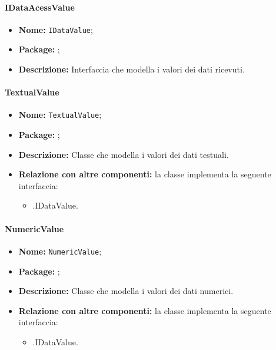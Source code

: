 \paragraph{IDataAcessValue}
\begin{itemize}
\item \textbf{Nome:} \texttt{IDataValue};
\item \textbf{Package:} \texttt{\smodel{}};
\item \textbf{Descrizione:} Interfaccia che modella i valori dei dati ricevuti.
\end{itemize}

\paragraph{TextualValue}
\begin{itemize}
\item \textbf{Nome:} \texttt{TextualValue};
\item \textbf{Package:} \texttt{\smodel{}};
\item \textbf{Descrizione:} Classe che modella i valori dei dati testuali.
\item \textbf{Relazione con altre componenti:} la classe implementa la seguente interfaccia:
		\begin{itemize}
			\item \smodel{}.IDataValue.
		\end{itemize}
\end{itemize}

\paragraph{NumericValue}
\begin{itemize}
\item \textbf{Nome:} \texttt{NumericValue};
\item \textbf{Package:} \texttt{\smodel{}};
\item \textbf{Descrizione:} Classe che modella i valori dei dati numerici.
\item \textbf{Relazione con altre componenti:} la classe implementa la seguente interfaccia:
		\begin{itemize}
			\item \smodel{}.IDataValue.
		\end{itemize}
\end{itemize}

